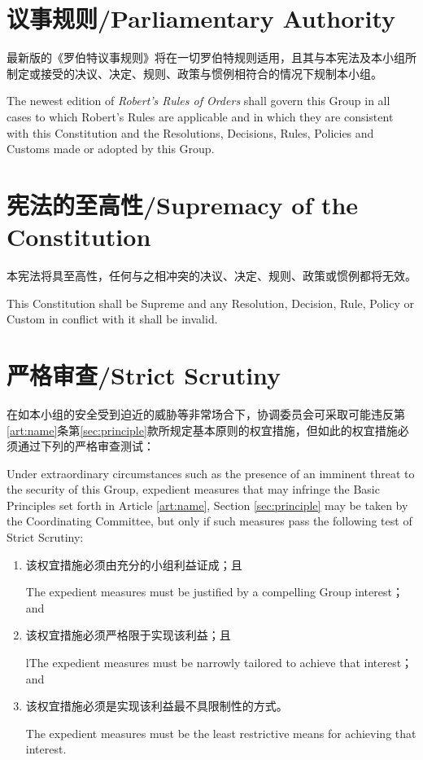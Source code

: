 \documentclass[12pt]{aspasia-constitution}
\begin{document}
	\section{议事规则/Parliamentary Authority}
	
	最新版的《罗伯特议事规则》将在一切罗伯特规则适用，且其与本宪法及本小组所制定或接受的决议、决定、规则、政策与惯例相符合的情况下规制本小组。
	
	The newest edition of \textit{Robert's Rules of Orders} shall govern this Group in all cases to which Robert's Rules are applicable and in which they are consistent with this Constitution and the Resolutions, Decisions, Rules, Policies and Customs made or adopted by this Group.
	
	\section{宪法的至高性/Supremacy of the Constitution}
	
	本宪法将具至高性，任何与之相冲突的决议、决定、规则、政策或惯例都将无效。
	
	This Constitution shall be Supreme and any Resolution, Decision, Rule, Policy or Custom in conflict with it shall be invalid.
	
	\section{严格审查/Strict Scrutiny}
	
	在如本小组的安全受到迫近的威胁等非常场合下，协调委员会可采取可能违反第\ref{art:name}条第\ref{sec:principle}款所规定基本原则的权宜措施，但如此的权宜措施必须通过下列的严格审查测试：
	
	Under extraordinary circumstances such as the presence of an imminent threat to the security of this Group, expedient measures that may infringe the Basic Principles set forth in Article \ref{art:name}, Section \ref{sec:principle} may be taken by the Coordinating Committee, but only if such measures pass the following test of Strict Scrutiny:
	
	\begin{enumerate}[leftmargin=1.25cm]
	\item 该权宜措施必须由充分的小组利益证成；且\par
	The expedient measures must be justified by a compelling Group interest； and
	\item  该权宜措施必须严格限于实现该利益；且\par
	lThe expedient measures must be narrowly tailored to achieve that interest； and
	\item 该权宜措施必须是实现该利益最不具限制性的方式。\par
	The expedient measures must be the least restrictive means for achieving that interest.
	\end{enumerate}
\end{document}
